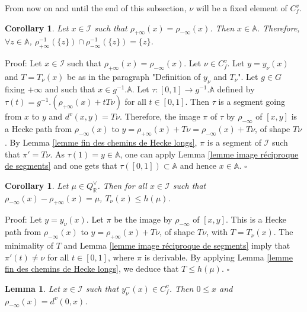 \documentclass[12pt]{article}
\theoremstyle{plain}
\newtheorem{cor}[thm]{Corollary}
\newtheorem{lemme}[thm]{Lemma}
\theoremstyle{definition}
\newcommand{\R}{\mathbb{R}}
\newcommand{\A}{\mathbb{A}}
\newcommand{\I}{\mathcal{I}}
\begin{document}
From now on and until the end of this subsection, $\nu$ will be a fixed element of $C_f^v$.

\begin{cor}\label{cor points ayant meme image par les rétractions}
 Let $x\in\mathcal{I}$ such that $\rho_{+\infty}(x)=\rho_{-\infty}(x)$. Then $x\in \mathbb{A}$. Therefore, $\forall z\in \mathbb{A}$, $\rho_{+\infty}^{-1}(\{z\})\cap\rho_{-\infty}^{-1}(\{z\})=\{z\}$.
\end{cor}


Proof:  Let $x\in\mathcal{I}$ such that $\rho_{+\infty}(x)=\rho_{-\infty}(x)$. Let $\nu\in C_f^v$. Let $y=y_\nu(x)$ and $T=T_\nu(x)$ be as in the paragraph "Definition of $y_\nu$ and $T_\nu$". Let $g\in G$ fixing $+\infty$ and such that $x\in g^{-1}.\A$. Let $\tau:[0,1]\rightarrow g^{-1}.\A$ defined by $\tau(t)=g^{-1}.(\rho_{+\infty}(x)+tT\nu)$ for all $t\in [0,1]$. Then $\tau$ is a segment going from $x$ to $y$ and $d^v(x,y)=T\nu$. Therefore, the image $\pi$ of $\tau$ by $\rho_{-\infty}$ of $[x,y]$ is a Hecke path from $\rho_{-\infty}(x)$ to $y=\rho_{+\infty}(x)+T\nu=\rho_{-\infty}(x)+T\nu$, of shape $T\nu$. By Lemma \ref{lemme fin des chemins de Hecke longs}, $\pi$ is a segment of $\mathcal{I}$ such that $\pi'=T\nu$. As $\tau(1)=y\in \A$, one can apply Lemma \ref{lemme image réciproque de segments} and one gets that $\tau([0,1])\subset \mathbb{A}$ and hence $x\in \mathbb{A}$. $\square$

\begin{cor}\label{corollaire majoration de T}
Let $\mu\in Q^\vee_\R$. Then for all $x\in \I$ such that $\rho_{-\infty}(x)-\rho_{+\infty}(x)=\mu$, $T_\nu(x)\leq h(\mu)$.
\end{cor}

Proof: Let $y=y_\nu(x)$. Let $\pi$ be the image by $\rho_{-\infty}$ of $[x,y]$. This is a Hecke path from $\rho_{-\infty}(x)$ to $y=\rho_{+\infty}(x)+T\nu$, of shape $T\nu$, with $T=T_\nu(x)$. The minimality of $T$ and Lemma \ref{lemme image réciproque de segments} imply that $\pi'(t)\neq \nu$ for all $t\in [0,1]$, where $\pi$ is derivable. By applying Lemma \ref{lemme fin des chemins de Hecke longs}, we deduce that $T\leq h(\mu)$. $\square$




\begin{lemme}\label{lemme_rétraction et distance vectorielle}
Let $x\in \mathcal{I}$ such that $y_\nu^-(x)\in C^v_f$. Then $0\leq x$ and $\rho_{-\infty}(x)=d^v(0,x)$.
\end{lemme}
\end{document}
